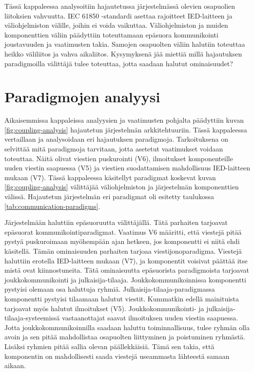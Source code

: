 Tässä kappaleessa analysoitiin hajautetussa järjestelmässä olevien osapuolien liitoksien vahvuutta. IEC 61850 -standardi asettaa rajoitteet IED-laitteen ja väliohjelmiston välille, joihin ei voida vaikuttaa. Väliohjelmiston ja muiden komponenttien väliin päädyttiin toteuttamaan epäsuora kommunikointi joustavuuden ja vaatimusten takia. Samojen osapuolten väliin halutiin toteuttaa heikko väliliitos ja vahva aikaliitos. Kysymyksenä jää miettiä millä hajautuksen paradigmoilla välittäjä tulee toteuttaa, jotta saadaan halutut ominaisuudet?


\section{Paradigmojen analyysi}
Aikaisemmissa kappaleissa analyysien ja vaatimusten pohjalta päädyttiin kuvan \ref{fig:coupling-analysis} hajautetun järjestelmän arkkitehtuuriin. Tässä kappaleessa vertaillaan ja analysoidaan eri hajautuksen paradigmoja. Tarkoituksena on selvittää mitä paradigmoja tarvitaan, jotta asetetut vaatimukset voidaan toteuttaa. Näitä olivat viestien puskurointi (V6), ilmoitukset komponenteille uuden viestin saapuessa (V5) ja viestien suodattamisen mahdollisuus IED-laitteen mukaan (V7). Tässä kappaleessa käsitellyt paradigmat koskevat kuvan \ref{fig:coupling-analysis} välittäjää väliohjelmiston ja järjestelmän komponenttien välissä. Hajautetun järjestelmän eri paradigmat oli esitetty taulukossa \ref{tab:communication-paradigms}.

Järjestelmään haluttiin epäsuoruutta välittäjällä. Tätä parhaiten tarjoavat epäsuorat kommunikointiparadigmat. Vaatimus V6 määritti, että viestejä pitää pystyä puskuroimaan myöhempään ajan hetkeen, jos komponentti ei niitä ehdi käsitellä. Tämän ominaisuuden parhaiten tarjoaa viestijonoparadigma. Viestejä haluttiin erotella IED-laitteen mukaan (V7), ja komponentit voisivat päättää itse mistä ovat kiinnostuneita. Tätä ominaisuutta epäsuorista paradigmoista tarjoavat joukkokommunikointi ja julkaisija-tilaaja. Joukkokommunikoinnissa komponentti pystyisi olemaan osa haluttuja ryhmiä. Julkaisija-tilaaja-paradigmassa komponentti pystyisi tilaamaan halutut viestit. Kummatkin edellä mainituista tarjoavat myös halutut ilmoitukset (V5). Joukkokommunikointi- ja julkaisija-tilaaja-systeemissä vastaanottajat saavat ilmoituksen uuden viestin saapuessa. Jotta joukkokommunikoinnilla saadaan haluttu toiminnallisuus, tulee ryhmän olla avoin ja sen pitää mahdollistaa osapuolten liittyminen ja poistuminen ryhmästä. Lisäksi ryhmien pitää sallia olevan päällekkäisiä. Tämä sen takia, että komponentin on mahdollisesti saada viestejä useammasta lähteestä samaan aikaan.

